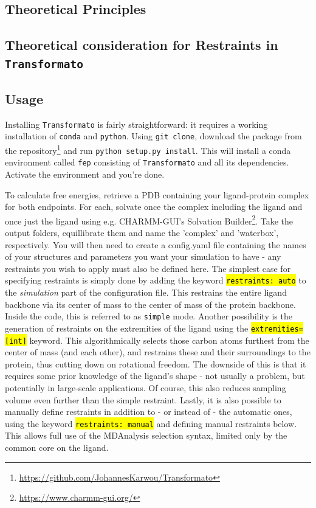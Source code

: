 \documentclass[oneside]{scrreprt}
\newcommand{\code}[1]{\texttt{\hl{#1}}}
\begin{document}
\subsection{Theoretical Principles}
\subsection{Theoretical consideration for Restraints in \texttt{Transformato}}
\subsection{Usage}
Installing \texttt{Transformato} is fairly straightforward: it requires a working installation of \texttt{conda} and \texttt{python}. Using \texttt{git clone}, download the package from the repository\footnote{\url{https://github.com/JohannesKarwou/Transformato}} and run \texttt{python setup.py install}. This will install a conda environment called \texttt{fep} consisting of \texttt{Transformato} and all its dependencies. Activate the environment and you're done.

To calculate free energies, retrieve a PDB containing your ligand-protein complex for both endpoints. For each, solvate once the complex including the ligand and once just the ligand using e.g. CHARMM-GUI's Solvation Builder\footnote{\url{https://www.charmm-gui.org/}}. Take the output folders, equillibrate them and name the 'complex' and 'waterbox', respectively. You will then need to create a config.yaml file containing the names of your structures and parameters you want your simulation to have - any restraints you wish to apply must also be defined here. The simplest case for specifying restraints is simply done by adding the keyword \code{restraints: auto} to the \emph{simulation} part of the configuration file. This restrains the entire ligand backbone via its center of mass to the center of mass of the protein backbone. Inside the code, this is referred to as \texttt{simple} mode. Another possibility is the generation of restraints on the extremities of the ligand using the \code{extremities=[int]} keyword. This algorithmically selects those carbon atoms furthest from the center of mass (and each other), and restrains these and their surroundings to the protein, thus cutting down on rotational freedom. The downside of this is that it requires some prior knowledge of the ligand's shape - not usually a problem, but potentially in large-scale applications. Of course, this also reduces sampling volume even further than the simple restraint. Lastly, it is also possible to manually define restraints in addition to - or instead of - the automatic ones, using the keyword \code{restraints: manual} and defining manual restraints below. This allows full use of the MDAnalysis\supercite{agrawal2011,oliver_beckstein-proc-scipy-2016} selection syntax, limited only by the common core on the ligand.
\end{document}
